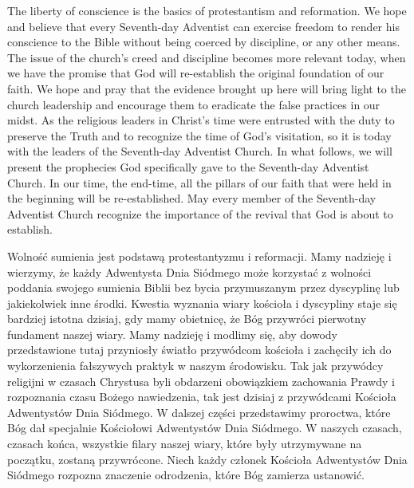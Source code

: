 The liberty of conscience is the basics of protestantism and reformation. We hope and believe that every Seventh-day Adventist can exercise freedom to render his conscience to the Bible without being coerced by discipline, or any other means. The issue of the church's creed and discipline becomes more relevant today, when we have the promise that God will re-establish the original foundation of our faith. We hope and pray that the evidence brought up here will bring light to the church leadership and encourage them to eradicate the false practices in our midst. As the religious leaders in Christ’s time were entrusted with the duty to preserve the Truth and to recognize the time of God’s visitation, so it is today with the leaders of the Seventh-day Adventist Church. In what follows, we will present the prophecies God specifically gave to the Seventh-day Adventist Church. In our time, the end-time, all the pillars of our faith that were held in the beginning will be re-established. May every member of the Seventh-day Adventist Church recognize the importance of the revival that God is about to establish.


Wolność sumienia jest podstawą protestantyzmu i reformacji. Mamy nadzieję i wierzymy, że każdy Adwentysta Dnia Siódmego może korzystać z wolności poddania swojego sumienia Biblii bez bycia przymuszanym przez dyscyplinę lub jakiekolwiek inne środki. Kwestia wyznania wiary kościoła i dyscypliny staje się bardziej istotna dzisiaj, gdy mamy obietnicę, że Bóg przywróci pierwotny fundament naszej wiary. Mamy nadzieję i modlimy się, aby dowody przedstawione tutaj przyniosły światło przywódcom kościoła i zachęciły ich do wykorzenienia fałszywych praktyk w naszym środowisku. Tak jak przywódcy religijni w czasach Chrystusa byli obdarzeni obowiązkiem zachowania Prawdy i rozpoznania czasu Bożego nawiedzenia, tak jest dzisiaj z przywódcami Kościoła Adwentystów Dnia Siódmego. W dalszej części przedstawimy proroctwa, które Bóg dał specjalnie Kościołowi Adwentystów Dnia Siódmego. W naszych czasach, czasach końca, wszystkie filary naszej wiary, które były utrzymywane na początku, zostaną przywrócone. Niech każdy członek Kościoła Adwentystów Dnia Siódmego rozpozna znaczenie odrodzenia, które Bóg zamierza ustanowić.




% 